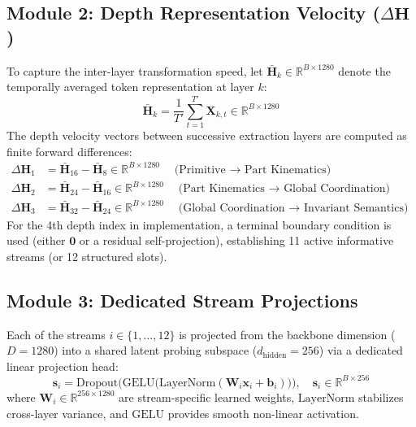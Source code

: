 \documentclass[a4paper, 11pt]{article}
\begin{document}
\subsection{Module 2: Depth Representation Velocity (\texorpdfstring{$\Delta\mathbf{H}$}{Delta H})}
To capture the inter-layer transformation speed, let $\bar{\mathbf{H}}_k \in \mathbb{R}^{B \times 1280}$ denote the temporally averaged token representation at layer $k$:
\begin{equation}
    \bar{\mathbf{H}}_k = \frac{1}{T'} \sum_{t=1}^{T'} \mathbf{X}_{k, t} \in \mathbb{R}^{B \times 1280}
\end{equation}
The depth velocity vectors between successive extraction layers are computed as finite forward differences:
\begin{align}
    \Delta\mathbf{H}_1 &= \bar{\mathbf{H}}_{16} - \bar{\mathbf{H}}_8 \in \mathbb{R}^{B \times 1280} \quad \text{(Primitive $\rightarrow$ Part Kinematics)} \\
    \Delta\mathbf{H}_2 &= \bar{\mathbf{H}}_{24} - \bar{\mathbf{H}}_{16} \in \mathbb{R}^{B \times 1280} \quad \text{(Part Kinematics $\rightarrow$ Global Coordination)} \\
    \Delta\mathbf{H}_3 &= \bar{\mathbf{H}}_{32} - \bar{\mathbf{H}}_{24} \in \mathbb{R}^{B \times 1280} \quad \text{(Global Coordination $\rightarrow$ Invariant Semantics)}
\end{align}
For the 4th depth index in implementation, a terminal boundary condition is used (either $\mathbf{0}$ or a residual self-projection), establishing 11 active informative streams (or 12 structured slots).

\subsection{Module 3: Dedicated Stream Projections}
Each of the streams $i \in \{1, \dots, 12\}$ is projected from the backbone dimension ($D=1280$) into a shared latent probing subspace ($d_{\text{hidden}} = 256$) via a dedicated linear projection head:
\begin{equation}
    \mathbf{s}_i = \text{Dropout}\Big(\text{GELU}\big(\text{LayerNorm}(\mathbf{W}_i \mathbf{x}_i + \mathbf{b}_i)\big)\Big), \quad \mathbf{s}_i \in \mathbb{R}^{B \times 256}
\end{equation}
where $\mathbf{W}_i \in \mathbb{R}^{256 \times 1280}$ are stream-specific learned weights, $\text{LayerNorm}$ stabilizes cross-layer variance, and $\text{GELU}$ provides smooth non-linear activation.
\end{document}
